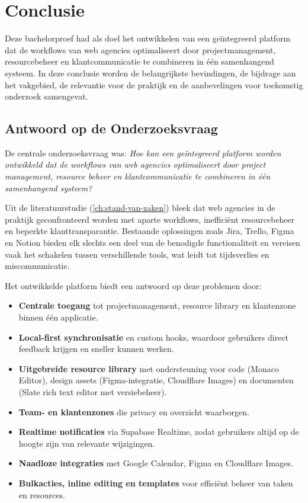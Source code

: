 
\chapter{Conclusie}%
\label{ch:conclusie}

Deze bachelorproef had als doel het ontwikkelen van een geïntegreerd platform dat de workflows van web agencies optimaliseert door projectmanagement, resourcebeheer en klantcommunicatie te combineren in één samenhangend systeem. In deze conclusie worden de belangrijkste bevindingen, de bijdrage aan het vakgebied, de relevantie voor de praktijk en de aanbevelingen voor toekomstig onderzoek samengevat.

\section{Antwoord op de Onderzoeksvraag}

De centrale onderzoeksvraag was: \emph{Hoe kan een geïntegreerd platform worden ontwikkeld dat de workflows van web agencies optimaliseert door project management, resource beheer en klantcommunicatie te combineren in één samenhangend systeem?}

Uit de literatuurstudie (\autoref{ch:stand-van-zaken}) bleek dat web agencies in de praktijk geconfronteerd worden met aparte workflows, inefficiënt resourcebeheer en beperkte klanttransparantie. Bestaande oplossingen zoals Jira, Trello, Figma en Notion bieden elk slechts een deel van de benodigde functionaliteit en vereisen vaak het schakelen tussen verschillende tools, wat leidt tot tijdsverlies en miscommunicatie.

Het ontwikkelde platform biedt een antwoord op deze problemen door:
\begin{itemize}
    \item \textbf{Centrale toegang} tot projectmanagement, resource library en klantenzone binnen één applicatie.
    \item \textbf{Local-first synchronisatie} en custom hooks, waardoor gebruikers direct feedback krijgen en sneller kunnen werken.
    \item \textbf{Uitgebreide resource library} met ondersteuning voor code (Monaco Editor), design assets (Figma-integratie, Cloudflare Images) en documenten (Slate rich text editor met versiebeheer).
    \item \textbf{Team- en klantenzones} die privacy en overzicht waarborgen.
    \item \textbf{Realtime notificaties} via Supabase Realtime, zodat gebruikers altijd op de hoogte zijn van relevante wijzigingen.
    \item \textbf{Naadloze integraties} met Google Calendar, Figma en Cloudflare Images.
    \item \textbf{Bulkacties, inline editing en templates} voor efficiënt beheer van taken en resources.
\end{itemize}

